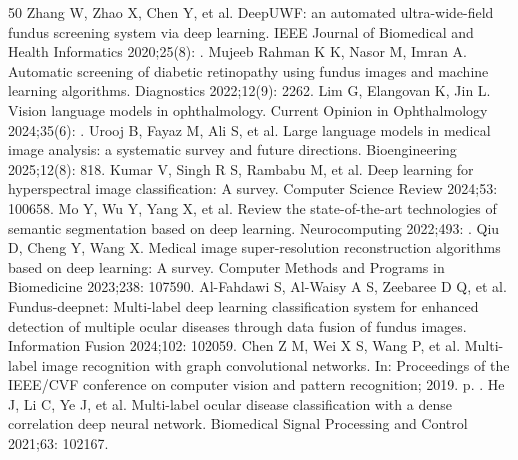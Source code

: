 \begin{thebibliography}{50}
Zhang W, Zhao X, Chen Y, et al. DeepUWF: an automated ultra-wide-field fundus screening system via deep learning. IEEE Journal of Biomedical and Health Informatics 2020;25(8): .
Mujeeb Rahman K K, Nasor M, Imran A. Automatic screening of diabetic retinopathy using fundus images and machine learning algorithms. Diagnostics 2022;12(9): 2262.
Lim G, Elangovan K, Jin L. Vision language models in ophthalmology. Current Opinion in Ophthalmology 2024;35(6): .
Urooj B, Fayaz M, Ali S, et al. Large language models in medical image analysis: a systematic survey and future directions. Bioengineering 2025;12(8): 818.
Kumar V, Singh R S, Rambabu M, et al. Deep learning for hyperspectral image classification: A survey. Computer Science Review 2024;53: 100658.
Mo Y, Wu Y, Yang X, et al. Review the state-of-the-art technologies of semantic segmentation based on deep learning. Neurocomputing 2022;493: .
Qiu D, Cheng Y, Wang X. Medical image super-resolution reconstruction algorithms based on deep learning: A survey. Computer Methods and Programs in Biomedicine 2023;238: 107590.
Al-Fahdawi S, Al-Waisy A S, Zeebaree D Q, et al. Fundus-deepnet: Multi-label deep learning classification system for enhanced detection of multiple ocular diseases through data fusion of fundus images. Information Fusion 2024;102: 102059.
Chen Z M, Wei X S, Wang P, et al. Multi-label image recognition with graph convolutional networks. In: Proceedings of the IEEE/CVF conference on computer vision and pattern recognition; 2019. p. .
He J, Li C, Ye J, et al. Multi-label ocular disease classification with a dense correlation deep neural network. Biomedical Signal Processing and Control 2021;63: 102167.

\end{thebibliography}
